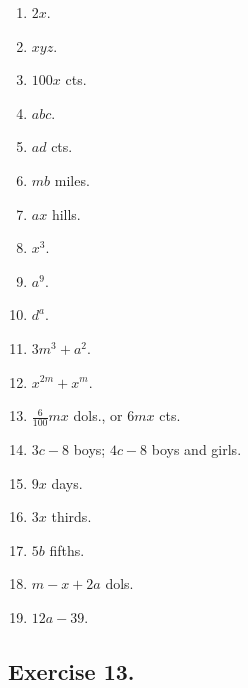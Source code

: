 \documentclass{book}
\begin{document}
\begin{enumerate}

 \item $2x$.

\item $xyz$.

\item $100x$ cts.

\item $abc$.

\item $ad$ cts.

\item $mb$ miles.

\item $ax$ hills.

\item $x^3$.

\item $a^9$.

\item $d^a$.

\item $3m^3 + a^2$.

\item $x^{2m} + x^m$.

\item $\frac{6}{100}mx$ dols., or $6mx$ cts.

\item $3c - 8$ boys; $4c - 8$ boys and girls.

\item $9x$ days.

\item $3x$ thirds.

\item $5b$ fifths.

\item $m - x + 2a$ dols.

\item $12a - 39$.

\end{enumerate}

\subsection*{Exercise 13.}
\end{document}
